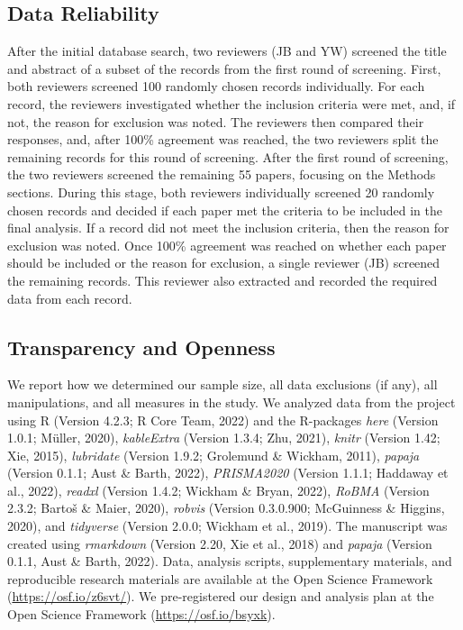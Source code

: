 \documentclass[
  ,pub,floatsintext]{apa6}
\begin{document}
\normalsize

\hypertarget{data-reliability}{%
\subsection{Data Reliability}\label{data-reliability}}

After the initial database search, two reviewers (JB and YW) screened the title and abstract of a subset of the records from the first round of screening. First, both reviewers screened 100 randomly chosen records individually. For each record, the reviewers investigated whether the inclusion criteria were met, and, if not, the reason for exclusion was noted. The reviewers then compared their responses, and, after 100\% agreement was reached, the two reviewers split the remaining records for this round of screening. After the first round of screening, the two reviewers screened the remaining 55 papers, focusing on the Methods sections. During this stage, both reviewers individually screened 20 randomly chosen records and decided if each paper met the criteria to be included in the final analysis. If a record did not meet the inclusion criteria, then the reason for exclusion was noted. Once 100\% agreement was reached on whether each paper should be included or the reason for exclusion, a single reviewer (JB) screened the remaining records. This reviewer also extracted and recorded the required data from each record.

\hypertarget{transparency-and-openness}{%
\subsection{Transparency and Openness}\label{transparency-and-openness}}

We report how we determined our sample size, all data exclusions (if any), all manipulations, and all measures in the study. We analyzed data from the project using R (Version 4.2.3; R Core Team, 2022) and the R-packages \emph{here} (Version 1.0.1; Müller, 2020), \emph{kableExtra} (Version 1.3.4; Zhu, 2021), \emph{knitr} (Version 1.42; Xie, 2015), \emph{lubridate} (Version 1.9.2; Grolemund \& Wickham, 2011), \emph{papaja} (Version 0.1.1; Aust \& Barth, 2022), \emph{PRISMA2020} (Version 1.1.1; Haddaway et al., 2022), \emph{readxl} (Version 1.4.2; Wickham \& Bryan, 2022), \emph{RoBMA} (Version 2.3.2; Bartoš \& Maier, 2020), \emph{robvis} (Version 0.3.0.900; McGuinness \& Higgins, 2020), and \emph{tidyverse} (Version 2.0.0; Wickham et al., 2019). The manuscript was created using \emph{rmarkdown} (Version 2.20, Xie et al., 2018) and \emph{papaja} (Version 0.1.1, Aust \& Barth, 2022). Data, analysis scripts, supplementary materials, and reproducible research materials are available at the Open Science Framework (\url{https://osf.io/z6svt/}). We pre-registered our design and analysis plan at the Open Science Framework (\url{https://osf.io/bsyxk}).
\end{document}

